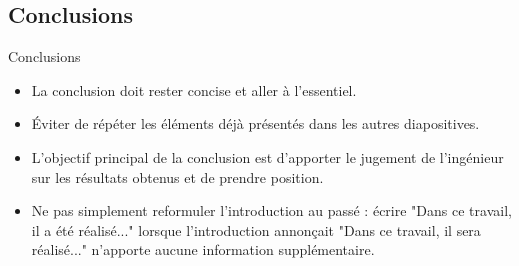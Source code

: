 \subsection{Conclusions}
\label{sec:Conclusions}

\begin{frame}[c]{Conclusions}
    \begin{itemize}
        \item La conclusion doit rester concise et aller à l'essentiel.
        \item Éviter de répéter les éléments déjà présentés dans les autres diapositives.
        \item L'objectif principal de la conclusion est d'apporter le jugement de l'ingénieur sur les résultats obtenus et de prendre position.
        \item Ne pas simplement reformuler l'introduction au passé : écrire "Dans ce travail, il a été réalisé..." lorsque l'introduction annonçait "Dans ce travail, il sera réalisé..." n'apporte aucune information supplémentaire.
    \end{itemize}
\end{frame}